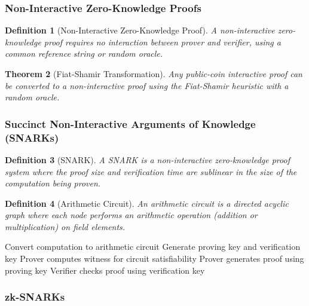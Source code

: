 \documentclass[11pt,a4paper]{article}
\newtheorem{theorem}{Theorem}[section]
\newtheorem{definition}[theorem]{Definition}
\begin{document}
\subsubsection{Non-Interactive Zero-Knowledge Proofs}

\begin{definition}[Non-Interactive Zero-Knowledge Proof]
A non-interactive zero-knowledge proof requires no interaction between prover and verifier, using a common reference string or random oracle.
\end{definition}

\begin{theorem}[Fiat-Shamir Transformation]
Any public-coin interactive proof can be converted to a non-interactive proof using the Fiat-Shamir heuristic with a random oracle.
\end{theorem}

\subsubsection{Succinct Non-Interactive Arguments of Knowledge (SNARKs)}

\begin{definition}[SNARK]
A SNARK is a non-interactive zero-knowledge proof system where the proof size and verification time are sublinear in the size of the computation being proven.
\end{definition}

\begin{definition}[Arithmetic Circuit]
An arithmetic circuit is a directed acyclic graph where each node performs an arithmetic operation (addition or multiplication) on field elements.
\end{definition}

\begin{algorithm}
\caption{SNARK Construction}
\begin{algorithmic}[1]
\STATE Convert computation to arithmetic circuit
\STATE Generate proving key and verification key
\STATE Prover computes witness for circuit satisfiability
\STATE Prover generates proof using proving key
\STATE Verifier checks proof using verification key
\end{algorithmic}
\end{algorithm}

\subsubsection{zk-SNARKs}
\end{document}
